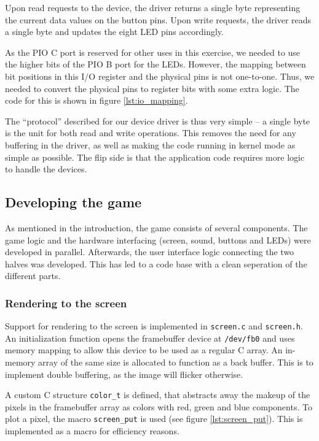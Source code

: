 Upon read requests to the device, the driver returns a single byte
representing the current data values on the button pins. Upon write
requests, the driver reads a single byte and updates the eight LED pins
accordingly.

As the PIO C port is reserved for other uses in this exercise, we needed
to use the higher bits of the PIO B port for the LEDs. However, the
mapping between bit positions in this I/O register and the physical pins
is not one-to-one. Thus, we needed to convert the physical pins to
register bits with some extra logic. The code for this is shown in
figure \ref{lst:io_mapping}.



The ``protocol'' described for our device driver is thus very simple --
a single byte is the unit for both read and write operations. This
removes the need for any buffering in the driver, as well as making the
code running in kernel mode as simple as possible. The flip side is that
the application code requires more logic to handle the devices.

\subsection{Developing the game}

As mentioned in the introduction, the game consists of several components. The
game logic and the hardware interfacing (screen, sound, buttons and
LEDs) were developed in parallel. Afterwards, the user interface logic
connecting the two halves was developed. This has led to a code base
with a clean seperation of the different parts.



\subsubsection{Rendering to the screen}

Support for rendering to the screen is implemented in \texttt{screen.c}
and \texttt{screen.h}. An initialization function opens the framebuffer
device at \texttt{/dev/fb0} and uses memory mapping to allow this device
to be used as a regular C array. An in-memory array of the same size is
allocated to function as a back buffer. This is to implement double
buffering, as the image will flicker otherwise.

A custom C structure \texttt{color\_t} is defined, that abstracts away
the makeup of the pixels in the framebuffer array as colors with red,
green and blue components. To plot a pixel, the macro
\texttt{screen\_put} is used (see figure \ref{lst:screen_put}). This is
implemented as a macro for efficiency reasons.

